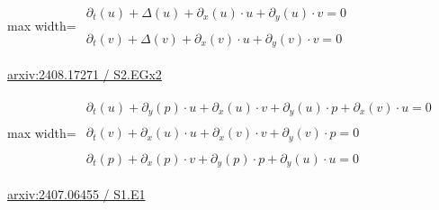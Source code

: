 \documentclass[UTF8,10pt,a4paper,fontset=mac]{ctexart}
\begin{document}
\begin{minipage}{\linewidth}\begin{center}\begin{adjustbox}{max width=\linewidth}$\displaystyle\begin{gathered}\begin{gathered}\partial_{t}(u)+\Delta(u)+\partial_{x}(u)\cdot u+\partial_{y}(u)\cdot v=0\end{gathered}\\[5pt]\begin{gathered}\partial_{t}(v)+\Delta(v)+\partial_{x}(v)\cdot u+\partial_{y}(v)\cdot v=0\end{gathered}\end{gathered}$\end{adjustbox}\end{center}{\small\href{https://arxiv.org/html/2408.17271#S2.EGx2}{arxiv:2408.17271 / S2.EGx2}}\par\end{minipage}\par\vspace{6mm}

\begin{minipage}{\linewidth}\begin{center}\begin{adjustbox}{max width=\linewidth}$\displaystyle\begin{gathered}\begin{gathered}\partial_{t}(u)+\partial_{y}(p)\cdot u+\partial_{x}(u)\cdot v+\partial_{y}(u)\cdot p+\partial_{x}(v)\cdot u=0\end{gathered}\\[5pt]\begin{gathered}\partial_{t}(v)+\partial_{x}(u)\cdot u+\partial_{x}(v)\cdot v+\partial_{y}(v)\cdot p=0\end{gathered}\\[5pt]\begin{gathered}\partial_{t}(p)+\partial_{x}(p)\cdot v+\partial_{y}(p)\cdot p+\partial_{y}(u)\cdot u=0\end{gathered}\end{gathered}$\end{adjustbox}\end{center}{\small\href{https://arxiv.org/html/2407.06455#S1.E1}{arxiv:2407.06455 / S1.E1}}\par\end{minipage}\par\vspace{6mm}
\end{document}

